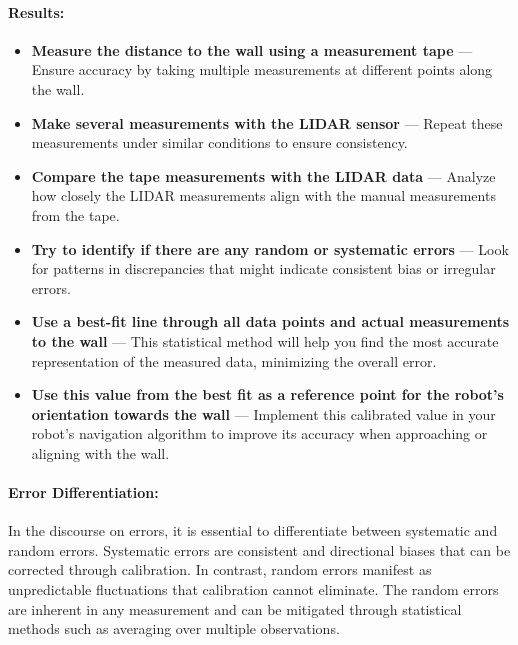 \documentclass[12pt,a4paper]{article}
\begin{document}
	\paragraph{Results:}
	\begin{itemize}
		\item \textbf{Measure the distance to the wall using a measurement tape} — Ensure accuracy by taking multiple measurements at different points along the wall.
		\item \textbf{Make several measurements with the LIDAR sensor} — Repeat these measurements under similar conditions to ensure consistency.
		\item \textbf{Compare the tape measurements with the LIDAR data} — Analyze how closely the LIDAR measurements align with the manual measurements from the tape.
		\item \textbf{Try to identify if there are any random or systematic errors} — Look for patterns in discrepancies that might indicate consistent bias or irregular errors.
		\item \textbf{Use a best-fit line through all data points and actual measurements to the wall} — This statistical method will help you find the most accurate representation of the measured data, minimizing the overall error.
		\item \textbf{Use this value from the best fit as a reference point for the robot's orientation towards the wall} — Implement this calibrated value in your robot’s navigation algorithm to improve its accuracy when approaching or aligning with the wall. 
	\end{itemize}
	
	\paragraph{Error Differentiation:}
	In the discourse on errors, it is essential to differentiate between systematic and random errors. Systematic errors are consistent and directional biases that can be corrected through calibration. In contrast, random errors manifest as unpredictable fluctuations that calibration cannot eliminate. The random errors are inherent in any measurement and can be mitigated through statistical methods such as averaging over multiple observations.
	\clearpage
\end{document}
